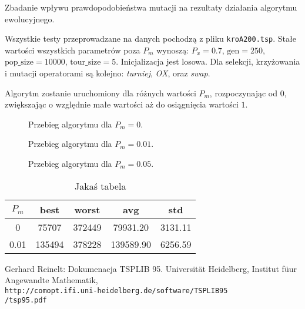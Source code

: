 \documentclass[12pt,a4paper]{article}
\begin{document}
\begin{description}[align=left,leftmargin=2.5cm,style=multiline]
  \item [Cel] Zbadanie wpływu prawdopodobieństwa mutacji na rezultaty działania algorytmu ewolucyjnego.
  \item [Założenia] Wszystkie testy przeprowadzane na danych pochodzą z pliku \texttt{kroA200.tsp}. Stałe wartości wszystkich parametrów poza $P_m$ wynoszą: $P_x = 0.7$, $\text{gen} = 250$, $\text{pop\_size} = 10000$, $\text{tour\_size} = 5$. Inicjalizacja jest losowa. Dla selekcji, krzyżowania i mutacji operatorami są kolejno: \textit{turniej}, \textit{OX}, oraz \textit{swap}.
  \item [Przebieg] Algorytm zostanie uruchomiony dla różnych wartości $P_m$, rozpoczynając od $0$, zwiększając o względnie małe wartości aż do osiągnięcia wartości $1$.
\end{description}
\begin{figure}[H]
  \begin{center}
    
  \end{center}
  \caption{Przebieg algorytmu dla $P_m = 0$.}
\end{figure}
\begin{figure}[H]
  \begin{center}
    
  \end{center}
  \caption{Przebieg algorytmu dla $P_m = 0.01$.}
\end{figure}
\begin{figure}[H]
  \begin{center}
    
  \end{center}
  \caption{Przebieg algorytmu dla $P_m = 0.05$.}
\end{figure}
\begin{table}[H]
  \centering
  \caption{Jakaś tabela}
  \begin{tabular}{| c | c | c | c | c |}
    \hline
    $P_m$ & best & worst & avg & std \\
    \hline
    0 & 75707 & 372449 & 79931.20 & 3131.11 \\
    0.01 & 135494 & 378228 & 139589.90 & 6256.59 \\
    \hline
  \end{tabular}
\end{table}

\begin{thebibliography}{9}
  Gerhard Reinelt: Dokumenacja TSPLIB 95. Universit{\"a}t Heidelberg, Institut f{\"u}ur Angewandte Mathematik,\\
  \texttt{http://comopt.ifi.uni-heidelberg.de/software/TSPLIB95\\/tsp95.pdf}
\end{thebibliography}
 
\end{document}

